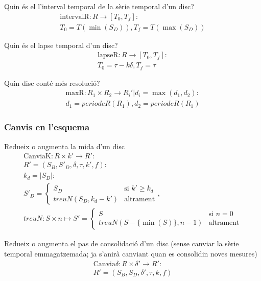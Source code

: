 Quin és el l'interval temporal de la sèrie temporal d'un disc?
  \begin{gather*}
    \text{intervalR}: R \longrightarrow [T_0,T_f] :\\
    T_0 = T(\min(S_D)),     T_f = T(\max(S_D))
  \end{gather*}

Quin és el lapse temporal d'un disc?
  \begin{gather*}
    \text{lapseR}: R \longrightarrow [T_0,T_f] :\\
    T_0 = \tau - k\delta,  T_f = \tau
  \end{gather*}




Quin disc conté més resolució?
  \begin{gather*}
    \text{maxR}: R_1 \times R_2 \longrightarrow R_i' | d_i = \max(d_1,d_2) : \\
    d_1 = periodeR(R_1), d_2 = periodeR(R_1)
  \end{gather*}
  





\subsubsection{Canvis en l'esquema}


Redueix o augmenta la mida d'un disc
  \begin{gather*}
    \text{CanviaK}: R \times k' \longrightarrow R': \\
    R' = (S_B,S'_D,\delta,\tau,k',f) : \\
    k_d = |S_D|:\\
    S'_D = \begin{cases}
      S_D         & \text{si } k' \geq k_d   \\
      treuN(S_D,k_d-k')    & \text{altrament}
    \end{cases}, \\
    treuN: S \times n \mapsto S'=  
    \begin{cases}
      S                & \text{si } n=0   \\
      treuN(S - \{\min(S)\},n-1)  & \text{altrament}
    \end{cases}
\end{gather*}


Redueix o augmenta el pas de consolidació d'un disc (sense canviar la sèrie temporal emmagatzemada; ja s'anirà canviant quan es consolidin noves mesures)
  \begin{gather*}
    \text{Canvia}\delta: R \times \delta' \longrightarrow R': \\
    R' = (S_B,S_D,\delta',\tau,k,f)
  \end{gather*}


